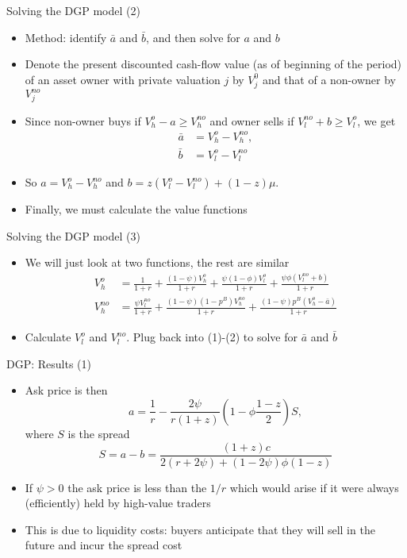 \documentclass[english,10pt
,aspectratio=169
]{beamer}
\begin{document}
\begin{frame}{Solving the DGP model (2)}
	\begin{itemize}
		\item Method: identify $\bar{a}$ and $\bar{b}$, and then solve for $a$ and $b$
		\item Denote the present discounted cash-flow value (as of beginning of the period) of an asset owner with private valuation $j$ by $V^0_j$ and that of a non-owner by $V^{no}_j$
		\item Since non-owner buys if $V^o_h-a \geq V^{no}_h$ and owner sells if $V^{no}_l+b \geq V^o_l$, we get
		\begin{align}
			\bar{a} 	&= V^o_h-V^{no}_h, \\
			\bar{b}	&= V^o_l-V^{no}_l 
		\end{align}
		\item So $a=V^o_h-V^{no}_h$ and $b=z(V^o_l-V^{no}_l ) + (1-z)\mu$.
		\item Finally, we must calculate the value functions
	\end{itemize}
\end{frame}


\begin{frame}{Solving the DGP model (3)}
	\begin{itemize}
		\item We will just look at two functions, the rest are similar
		\begin{align*}
			V^o_h 	& = \frac{1}{1+r} + \frac{(1-\psi)V^o_h}{1+r} + \frac{\psi(1-\phi)V^o_l}{1+r}+\frac{\psi\phi(V^{no}_l+b)}{1+r} \\
			V^{no}_h 	& = \frac{\psi V^{no}_l}{1+r} + \frac{(1-\psi)(1-p^B)V^{no}_h}{1+r}+\frac{(1-\psi)p^B (V^o_h-\bar{a})}{1+r}
		\end{align*}
		\item Calculate $V^o_l$ and $V^{no}_l$. Plug back into (1)-(2) to solve for $\bar{a}$ and $\bar{b}$
	\end{itemize}
\end{frame}


\begin{frame}{DGP: Results (1)}
	\begin{itemize}
		\item Ask price is then
		\[
		a=\frac{1}{r}-\frac{2\psi}{r(1+z)}\left(1-\phi\frac{1-z}{2}\right)S,
		\]
		where $S$ is the spread
		\[
		S=a-b=\frac{(1+z)c}{2(r+2\psi)+(1-2\psi)\phi(1-z)}
		\]
		\item If $\psi>0$ the ask price is less than the $1/r$ which would arise if it were always (efficiently) held by high-value traders
		\item This is due to liquidity costs: buyers anticipate that they will sell in the future and incur the spread cost
	\end{itemize}
\end{frame}
\end{document}
